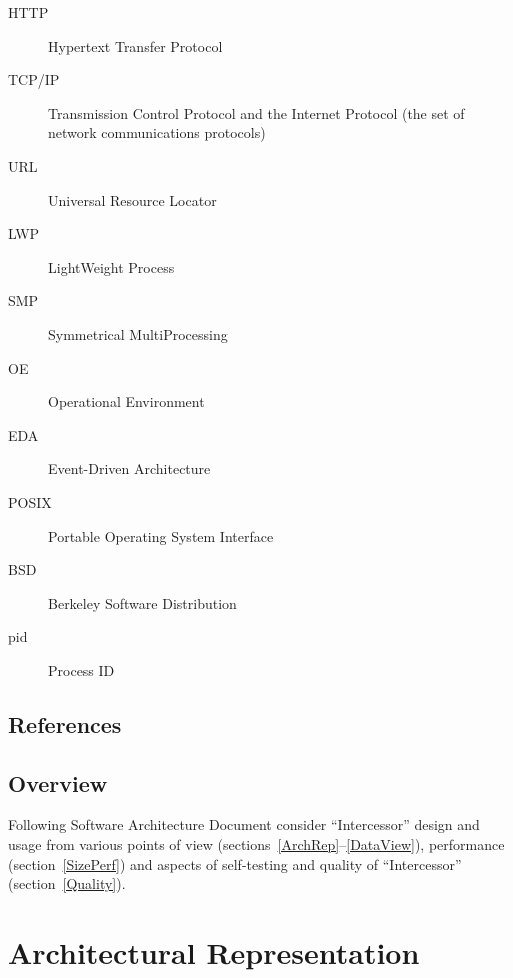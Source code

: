 \documentclass[a4paper,twoside]{article}
\newcommand{\Inter}{{\fontseries{b}\selectfont ``Intercessor''}}
\begin{document}
\begin{description}
  \item[HTTP] Hypertext Transfer Protocol
  \item[TCP/IP] Transmission Control Protocol and the Internet Protocol (the set of network communications protocols)
  \item[URL] Universal Resource Locator
  \item[LWP] LightWeight Process
  \item[SMP] Symmetrical MultiProcessing
  \item[OE] Operational Environment
  \item[EDA] Event-Driven Architecture
  \item[POSIX] Portable Operating System Interface
  \item[BSD] Berkeley Software Distribution
  \item[pid] Process ID
\end{description}

\subsection{References}




\subsection{Overview}


Following Software Architecture Document consider \Inter{} design and usage from various
points of view (sections~\ref{ArchRep}--\ref{DataView}), performance (section~\ref{SizePerf}) and
aspects of self-testing and quality of \Inter{} (section~\ref{Quality}).

\section{Architectural Representation\label{ArchRep}}

\end{document}
